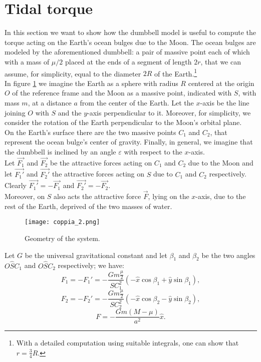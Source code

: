 \documentclass[11pt, oneside,reqno]{amsart}
\begin{document}
\section{Tidal torque}
\label{section_torque}
In this section we want to show how the dumbbell model is useful to compute the torque acting on the Earth's ocean bulges due to the Moon. 
The ocean bulges are modeled by the aforementioned dumbbell: a pair of massive point each of which with a mass of $\mu /2$ placed at the ends of a segment of length $2r$, that we can assume, for simplicity, equal to the diameter $2R$ of the Earth.\footnote{With a detailed computation using suitable integrals, one can show that $r=\frac{3}{4}R$.}\\
In figure \ref{torque} we imagine the Earth as a sphere with radius $R$ centered at the origin $O$ of the reference frame and the Moon as a massive point, indicated with $S$, with mass $m$, at a distance $a$ from the center of the Earth. Let the $x$-axis be the line joining $O$ with $S$ and the $y$-axis perpendicular to it. Moreover, for simplicity, we consider the rotation of the Earth perpendicular to the Moon's orbital plane.\\
On the Earth's surface there are the two massive points $C_1$ and $C_2$, that represent the ocean bulge's center of gravity. Finally, in general, we imagine that the dumbbell is inclined by an angle $\varepsilon$ with respect to the $x$-axis.\\
 Let $\vec{F_1}$ and $\vec{F_2}$ be the attractive forces acting on $C_1$ and $C_2$ due to the Moon and let $\vec{F_1'}$ and $\vec{F_2'}$ the attractive forces acting on $S$ due to $C_1$ and $C_2$ respectively. Clearly $\vec{F_1'}=-\vec{F_1}$ and $\vec{F_2'}=-\vec{F_2}$.\\
Moreover, on $S$ also acts the attractive force $\vec{F}$, lying on the $x$-axis, due to the rest of the Earth, deprived of the two masses of water.\\

\begin{figure}[h]
	\texttt{[image: coppia\_2.png]}
	\caption{Geometry of the system.}
	\label{torque}
\end{figure}

Let $G$ be the universal gravitational constant and let $\beta_1$ and $\beta_2$ be the two angles $O{\hat S}C_1$ and $O{\hat S}C_2$ respectively; we have:
\begin{equation}
	\label{F1}
	F_1=-F_1'=-\frac{Gm\frac{\mu}{2}}{SC_1^2}(-\hat{x} \cos \beta_1 + \hat{y} \sin \beta_1),
\end{equation}
\begin{equation}
	\label{F2}
	F_2=-F_2'=-\frac{Gm\frac{\mu}{2}}{SC_2^2}(-\hat{x} \cos \beta_2 - \hat{y} \sin \beta_2),
\end{equation}
\begin{equation}
	\label{F}
	F=-\frac{Gm(M- \mu)}{a^2}\hat{x}.
\end{equation}
\end{document}

